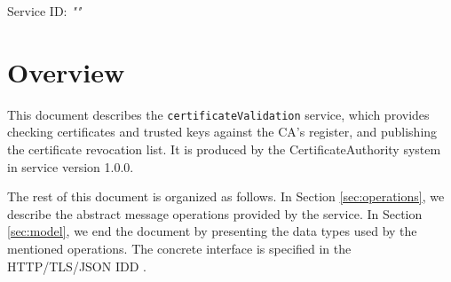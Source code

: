 \documentclass[a4paper]{arrowhead}
\begin{document}
\sloppy

\ArrowheadSetup

\begin{center}
  \vspace*{1cm}
  \huge{\arrowtitle}

  \vspace*{0.2cm}
  \LARGE{\arrowtype}
  \vspace*{1cm}

  \Large{Service ID: \textit{"\arrowid"}}

  \vspace*{\fill}


  \vspace*{1cm}
  \vspace*{\fill}

  \begin{abstract}
    This document describes the \texttt{certificate\allowbreak{}Validation} service, version 1.0.0, produced by the CertificateAuthority support system of Arrowhead 5.2.2.
  \end{abstract}

  \vspace*{1cm}
\end{center}

\newpage

\tableofcontents
\newpage

\section{Overview}
\label{sec:overview}

This document describes the \texttt{certificate\allowbreak{}Validation} service, which provides checking certificates and trusted keys against the CA's register, and publishing the certificate revocation list.
It is produced by the CertificateAuthority system \cite{cau-sysd} in service version 1.0.0.

The rest of this document is organized as follows.
In Section \ref{sec:operations}, we describe the abstract message operations provided by the service.
In Section \ref{sec:model}, we end the document by presenting the data types used by the mentioned operations.
The concrete interface is specified in the HTTP/TLS/JSON IDD \cite{cau-certificateValidation-http-idd}.
\end{document}
